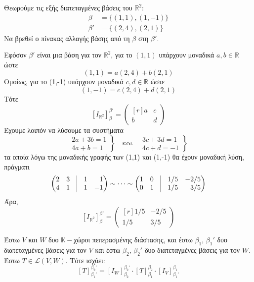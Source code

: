 \begin{example}
  Θεωρούμε τις εξής διατεταγμένες βάσεις του $ \mathbb{R}^{2} $: 
  \begin{align*}
    \beta &= \{ (1,1), (1,-1) \} \\
    \beta ' &= \{ (2,4), (2,1) \}
  \end{align*}
  Να βρεθεί ο πίνακας αλλαγής βάσης από τη $\beta$ στη $\beta'$.
\end{example}

\begin{solution}
  Εφόσον $\beta'$ είναι μια βάση για τον $ \mathbb{R}^{2} $, για το $ (1,1) $ 
  υπάρχουν μοναδικά $ a,b \in \mathbb{R} $ ώστε 
  \[
    (1,1) = a (2,4) + b(2,1) 
  \]
  Ομοίως, για το (1,-1) υπάρχουν μοναδικά $ c,d \in \mathbb{R} $ ώστε 
  \[
    (1,-1) = c(2,4) + d(2,1) 
  \] 
  Τότε
  \[
    [I_{\mathbb{R}^{2}}]_{\beta}^{\beta'} = 
    \begin{pmatrix*}[r]
      a & c \\
      b & d
    \end{pmatrix*}
  \] 
  Έχουμε λοιπόν να λύσουμε τα συστήματα 
  \[
    \left.
      \begin{matrix}
        2a + 3b = 1 \\
        4a + b = 1
      \end{matrix} 
    \right\} \quad \text{και} \quad 
    \left.
      \begin{matrix}
        3c + 3d = 1 \\
        4c + d = -1
      \end{matrix} 
    \right\} 
  \] 
  τα οποία λόγω της μοναδικής γραφής των (1,1) και (1,-1) θα έχουν μοναδική λύση, 
  πράγματι
  \[
    \begin{pmatrix*}[r]
      2 & 3 & \vrule & 1 & 1 \\
      4 & 1 & \vrule & 1 & -1
    \end{pmatrix*} \sim \cdots \sim
    \begin{pmatrix*}[r]
      1 & 0 & \vrule & 1/5 & -2/5 \\
      0 & 1 & \vrule & 1/5 & 3/5
    \end{pmatrix*}
  \] 
  Άρα, 
  \[
    [I_{\mathbb{R}^{2}}]_{\beta}^{\beta'} = 
    \begin{pmatrix*}[r]
      1/5 & -2/5 \\
      1/5 & 3/5
    \end{pmatrix*}
  \] 
\end{solution}

\begin{thm}
  Έστω $V$ και $W$ δυο $ \mathbb{K}- $χώροι πεπερασμένης διάστασης, και έστω 
  $\beta_{1}$, ${\beta_{1}}'$ δυο διατεταγμένες βάσεις για τον $V$ και έστω 
  $\beta_{2}$, ${{\beta}_{2}}'$ δυο διατεταγμένες βάσεις για τον $W$. Έστω 
  $ T \in \mathcal{L}(V,W) $. Τότε ισχύει: 
  \[
    [T]_{{\beta_{1}}'}^{{\beta_{2}}'} = [I_{W}]_{\beta_{2}}^{{\beta_{2}}'} \cdot 
    [T] _{\beta_{1}}^{\beta_{2}} \cdot [I_{V}]_{{\beta_{1}}'}^{\beta_{1}}
  \] 
\end{thm}

